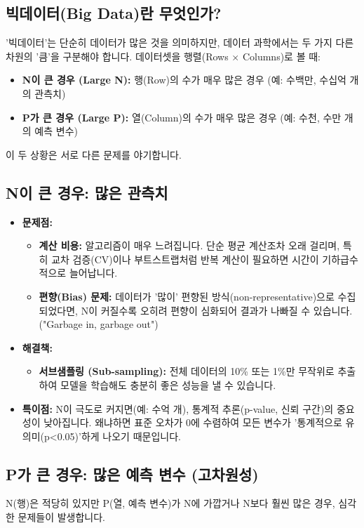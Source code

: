 \documentclass[11pt,a4paper]{book}
\theoremstyle{definition}
\begin{document}
\subsection{빅데이터(Big Data)란 무엇인가?}
'빅데이터'는 단순히 데이터가 많은 것을 의미하지만, 데이터 과학에서는 두 가지 다른 차원의 '큼'을 구분해야 합니다. 데이터셋을 행렬(Rows $\times$ Columns)로 볼 때:

\begin{itemize}
    \item \textbf{N이 큰 경우 (Large N):} 행(Row)의 수가 매우 많은 경우 (예: 수백만, 수십억 개의 관측치)
    \item \textbf{P가 큰 경우 (Large P):} 열(Column)의 수가 매우 많은 경우 (예: 수천, 수만 개의 예측 변수)
\end{itemize}
이 두 상황은 서로 다른 문제를 야기합니다.

\subsection{N이 큰 경우: 많은 관측치}
\begin{itemize}
    \item \textbf{문제점:}
        \begin{itemize}
            \item \textbf{계산 비용:} 알고리즘이 매우 느려집니다. 단순 평균 계산조차 오래 걸리며, 특히 교차 검증(CV)이나 부트스트랩처럼 반복 계산이 필요하면 시간이 기하급수적으로 늘어납니다.
            \item \textbf{편향(Bias) 문제:} 데이터가 '많이' 편향된 방식(non-representative)으로 수집되었다면, N이 커질수록 오히려 편향이 심화되어 결과가 나빠질 수 있습니다. ("Garbage in, garbage out")
        \end{itemize}
    \item \textbf{해결책:}
        \begin{itemize}
            \item \textbf{서브샘플링 (Sub-sampling):} 전체 데이터의 10\% 또는 1\%만 무작위로 추출하여 모델을 학습해도 충분히 좋은 성능을 낼 수 있습니다.
        \end{itemize}
    \item \textbf{특이점:} N이 극도로 커지면(예: 수억 개), 통계적 추론(p-value, 신뢰 구간)의 중요성이 낮아집니다. 왜냐하면 표준 오차가 0에 수렴하여 모든 변수가 '통계적으로 유의미(p<0.05)'하게 나오기 때문입니다.
\end{itemize}

\subsection{P가 큰 경우: 많은 예측 변수 (고차원성)}
N(행)은 적당히 있지만 P(열, 예측 변수)가 N에 가깝거나 N보다 훨씬 많은 경우, 심각한 문제들이 발생합니다.
\end{document}
